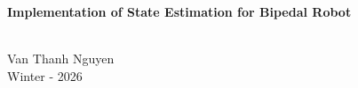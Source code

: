 \documentclass[11pt,a4paper]{article}
\numberwithin{equation}{section}
\begin{document}
\begin{center}
\begin{Large}
    \textbf{Implementation of State Estimation for Bipedal Robot}
\end{Large}
\\
Van Thanh Nguyen\\
Winter - 2026
\end{center}


\newpage

\end{document}
